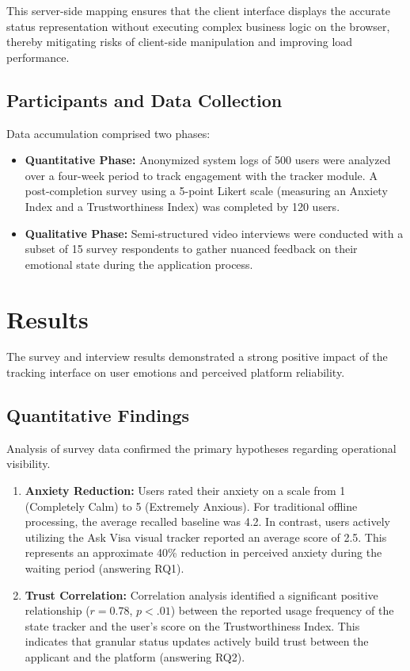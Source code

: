 \documentclass[journal, 10pt, twoside]{IEEEtran}
\begin{document}
This server-side mapping ensures that the client interface displays the accurate status representation without executing complex business logic on the browser, thereby mitigating risks of client-side manipulation and improving load performance.

\subsection{Participants and Data Collection}
Data accumulation comprised two phases:
\begin{itemize}
    \item \textbf{Quantitative Phase:} Anonymized system logs of 500 users were analyzed over a four-week period to track engagement with the tracker module. A post-completion survey using a 5-point Likert scale (measuring an Anxiety Index and a Trustworthiness Index) was completed by 120 users.
    \item \textbf{Qualitative Phase:} Semi-structured video interviews were conducted with a subset of 15 survey respondents to gather nuanced feedback on their emotional state during the application process.
\end{itemize}

\section{Results}
\label{sec:results}

The survey and interview results demonstrated a strong positive impact of the tracking interface on user emotions and perceived platform reliability.

\subsection{Quantitative Findings}
Analysis of survey data confirmed the primary hypotheses regarding operational visibility.
\begin{enumerate}
    \item \textbf{Anxiety Reduction:} Users rated their anxiety on a scale from 1 (Completely Calm) to 5 (Extremely Anxious). For traditional offline processing, the average recalled baseline was 4.2. In contrast, users actively utilizing the Ask Visa visual tracker reported an average score of 2.5. This represents an approximate 40\% reduction in perceived anxiety during the waiting period (answering RQ1).
    \item \textbf{Trust Correlation:} Correlation analysis identified a significant positive relationship ($r = 0.78$, $p < .01$) between the reported usage frequency of the state tracker and the user's score on the Trustworthiness Index. This indicates that granular status updates actively build trust between the applicant and the platform (answering RQ2).
\end{enumerate}
\end{document}
